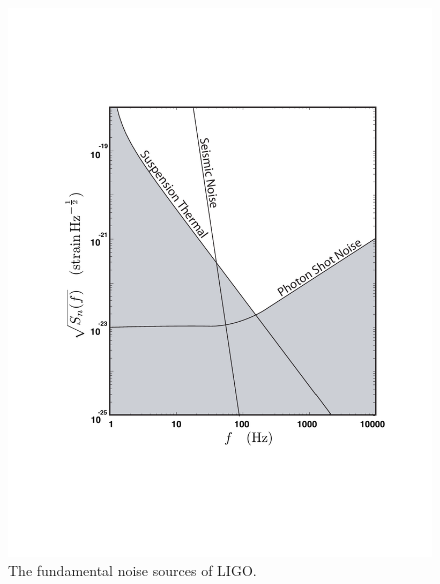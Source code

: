 \begin{figure}[p]
\begin{center}
\includegraphics[width=\linewidth]{figures/inspiral/ligonoise}
\end{center}
\caption[Fundamental Noise Sources of Initial LIGO]{%
\label{f:design_noisecurve}
The fundamental noise sources of LIGO.
}
\end{figure}

